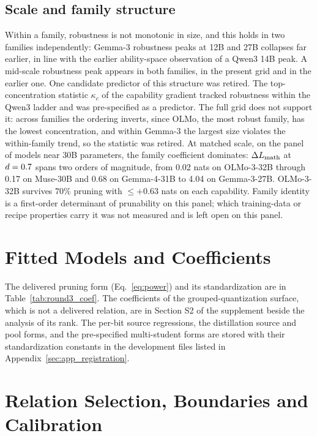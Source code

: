 \subsection{Scale and family structure}
\label{sec:family}

Within a family, robustness is not monotonic in size, and this holds in two families
independently: Gemma-3 robustness peaks at 12B and 27B collapses far earlier, in line with the earlier
ability-space observation of a Qwen3 14B peak. A mid-scale robustness peak appears in both families, in the present grid and in the earlier one.
One candidate predictor of this structure was retired. The
top-concentration statistic $\kappa_c$ of the capability gradient tracked robustness within the
Qwen3 ladder and was pre-specified as a predictor. The full grid does not support it: across families the
ordering inverts, since OLMo, the most robust family, has the lowest concentration, and within
Gemma-3 the largest size violates the within-family trend, so the statistic was retired.
At matched scale, on the panel of models near 30B parameters, the
family coefficient dominates: $\Delta L_{\text{math}}$ at $d=0.7$
spans two orders of magnitude, from 0.02 nats on OLMo-3-32B through 0.17 on Muse-30B and 0.68 on Gemma-4-31B to 4.04 on Gemma-3-27B. OLMo-3-32B survives $70\%$ pruning with
$\le+0.63$ nats on each capability. Family identity is a first-order determinant of prunability on this panel; which training-data or recipe properties carry it was not measured and is left open on this panel.

\section{Fitted Models and Coefficients}
\label{sec:app_coef}

The delivered pruning form (Eq.~\ref{eq:power}) and its standardization are in
Table~\ref{tab:round3_coef}. The coefficients of the grouped-quantization surface, which is not a
delivered relation, are in Section S2 of the supplement beside the analysis of its rank. The per-bit
source regressions, the distillation source and pool forms, and the pre-specified multi-student forms are
stored with their standardization constants in the development files listed in
Appendix~\ref{sec:app_registration}.


\section{Relation Selection, Boundaries and Calibration}
\label{sec:app_forms}

